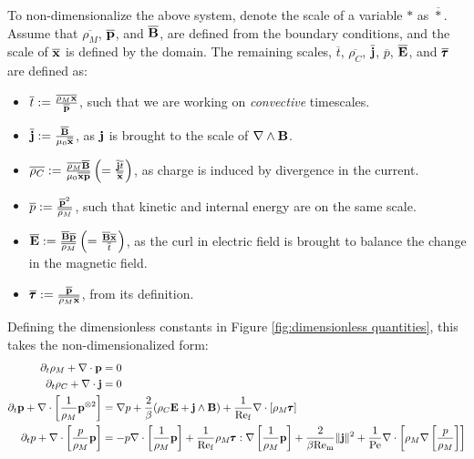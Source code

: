     To non-dimensionalize the above system, denote the scale of a variable $*$ as $\overline{*}$. Assume that $\overline{\rho_{M}}$, $\overline{\mathbf{p}}$, and $\overline{\mathbf{B}}$, are defined from the boundary conditions, and the scale of $\overline{\mathbf{x}}$ is defined by the domain. The remaining scales, $\overline{t}$, $\overline{\rho_{C}}$, $\overline{\mathbf{j}}$, $\overline{p}$, $\overline{\mathbf{E}}$, and $\overline{\pmb{\mathsf{\tau}}}$ are defined as:  
    \begin{itemize}
        \item  $\overline{t}  :=  \frac{\overline{\rho_{M}}\overline{\mathbf{x}}}{\overline{\mathbf{p}}}$, such that we are working on \emph{convective} timescales.
        \item  $\overline{\mathbf{j}}  :=  \frac{\overline{\mathbf{B}}}{\mu_{0}\overline{\mathbf{x}}}$, as $\mathbf{j}$ is brought to the scale of $\nabla\wedge\mathbf{B}$.
        \item  $\overline{\rho_{C}}  :=  \frac{\overline{\rho_{M}}\overline{\mathbf{B}}}{\mu_{0}\overline{\mathbf{x}}\overline{\mathbf{p}}}  \left(=  \frac{\overline{\mathbf{j}}\overline{t}}{\overline{\mathbf{x}}}\right)$, as charge is induced by divergence in the current.
        \item  $\overline{p}  :=  \frac{\overline{\mathbf{p}}^{2}}{\overline{\rho_{M}}}$, such that kinetic and internal energy are on the same scale.
        \item  $\overline{\mathbf{E}}  :=  \frac{\overline{\mathbf{B}}\overline{\mathbf{p}}}{\overline{\rho_{M}}}  \left(=  \frac{\overline{\mathbf{B}}\overline{\mathbf{x}}}{\overline{t}}\right)$, as the curl in electric field is brought to balance the change in the magnetic field.
        \item  $\overline{\pmb{\mathsf{\tau}}}  :=  \frac{\overline{\mathbf{p}}}{\overline{\rho_{M}}\overline{\mathbf{x}}}$, from its definition.
    \end{itemize}
    Defining the dimensionless constants in Figure \ref{fig:dimensionless quantities}, this takes the non-dimensionalized form:
    {\small \begin{align}
        \partial_{t}\rho_{M} + \nabla\cdot\mathbf{p}  &=  0  \\
        \partial_{t}\rho_{C} + \nabla\cdot\mathbf{j}  &=  0  \\
        \partial_{t}\mathbf{p} + \nabla\cdot\left[\frac{1}{\rho_{M}}\mathbf{p}^{\otimes 2}\right]  &=  \nabla p + \frac{2}{\beta}(\rho_{C}\mathbf{E} + \mathbf{j}\wedge\mathbf{B}) + \frac{1}{\mathrm{Re}_{\mathrm{f}}}\nabla\cdot[\rho_{M}\pmb{\mathsf{\tau}}]  \\
        \partial_{t}p + \nabla\cdot\left[\frac{p}{\rho_{M}}\mathbf{p}\right]  &=  - p\nabla\cdot\left[\frac{1}{\rho_{M}}\mathbf{p}\right] + \frac{1}{\mathrm{Re}_{\mathrm{f}}}\rho_{M}\pmb{\mathsf{\tau}}:\nabla\left[\frac{1}{\rho_{M}}\mathbf{p}\right] + \frac{2}{\beta\mathrm{Re}_{\mathrm{m}}}\|\mathbf{j}\|^{2} + \frac{1}{\mathrm{Pe}}\nabla\cdot\left[\rho_{M}\nabla\left[\frac{p}{\rho_{M}}\right]\right]
    \end{align}}
